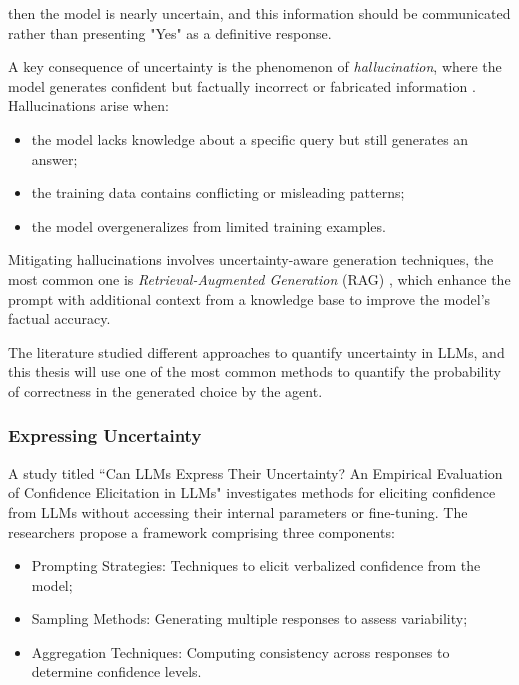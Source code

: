 then the model is nearly uncertain, and this information should be communicated rather
than presenting "Yes" as a definitive response.

A key consequence of uncertainty is the phenomenon of \emph{hallucination}, where
the model generates confident but factually incorrect or fabricated information \cite{Ji_2023}.
Hallucinations arise when:
\begin{itemize}
  \item the model lacks knowledge about a specific query but still generates an answer;

  \item the training data contains conflicting or misleading patterns;

  \item the model overgeneralizes from limited training examples.
\end{itemize}

Mitigating hallucinations involves uncertainty-aware generation techniques, the most
common one is \emph{Retrieval-Augmented Generation} (RAG)
\cite{lewis2021retrievalaugmentedgenerationknowledgeintensivenlp}, which enhance
the prompt with additional context from a knowledge base to improve the model's factual
accuracy.

The literature studied different approaches to quantify uncertainty in LLMs, and
this thesis will use one of the most common methods to quantify the probability
of correctness in the generated choice by the agent.

\subsubsection{Expressing Uncertainty}
A study titled ``Can LLMs Express Their Uncertainty? An Empirical Evaluation of Confidence
Elicitation in LLMs" \cite{xiong2024llmsexpressuncertaintyempirical}
investigates methods for eliciting confidence from LLMs without accessing their
internal parameters or fine-tuning. The researchers propose a framework comprising
three components:
\begin{itemize}
  \item Prompting Strategies: Techniques to elicit verbalized confidence from
    the model;

  \item Sampling Methods: Generating multiple responses to assess variability;

  \item Aggregation Techniques: Computing consistency across responses to
    determine confidence levels.
\end{itemize}

